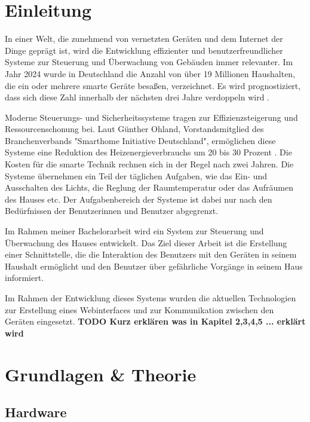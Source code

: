 \documentclass[12pt, letterpaper]{article}
\author{Oleksii Baida}
\date{Mai 2024}
\begin{document}


\tableofcontents
\pagebreak

\section{Einleitung}
\par In einer Welt, die zunehmend von vernetzten Geräten und dem Internet der Dinge geprägt ist, wird die Entwicklung effizienter und benutzerfreundlicher Systeme zur Steuerung und Überwachung von Gebäuden immer relevanter. Im Jahr 2024 wurde in Deutschland die Anzahl von über 19 Millionen Haushalten, die ein oder mehrere smarte Geräte besaßen, verzeichnet. Es wird prognostiziert, dass sich diese Zahl innerhalb der nächsten drei Jahre verdoppeln wird \cite{statita_smhomes}.
\par Moderne Steuerungs- und Sicherheitssysteme tragen zur Effizienzsteigerung und Ressourcenschonung bei. Laut Günther Ohland, Vorstandsmitglied des Branchenverbands "Smarthome Initiative Deutschland", ermöglichen diese Systeme eine Reduktion des Heizenergieverbrauchs um 20 bis 30 Prozent \cite{spiegel_heizung}. Die Kosten für die smarte Technik rechnen sich in der Regel nach zwei Jahren. Die Systeme übernehmen ein Teil der täglichen Aufgaben, wie das Ein- und Ausschalten des Lichts, die Reglung der Raumtemperatur oder das Aufräumen des Hauses etc. Der Aufgabenbereich der Systeme ist dabei nur nach den Bedürfnissen der Benutzerinnen und Benutzer abgegrenzt.
\par Im Rahmen meiner Bachelorarbeit wird ein System zur Steuerung und Überwachung des Hauses entwickelt. Das Ziel dieser Arbeit ist die Erstellung einer Schnittstelle, die die Interaktion des Benutzers mit den Geräten in seinem Haushalt ermöglicht und den Benutzer über gefährliche Vorgänge in seinem Haus informiert. 
\par Im Rahmen der Entwicklung dieses Systems wurden die aktuellen Technologien zur Erstellung eines Webinterfaces und zur Kommunikation zwischen den Geräten eingesetzt. \textbf{TODO Kurz erklären was in Kapitel 2,3,4,5 ... erklärt wird}

\newpage
\section{Grundlagen \& Theorie}

  \subsection{Hardware}
\end{document}
